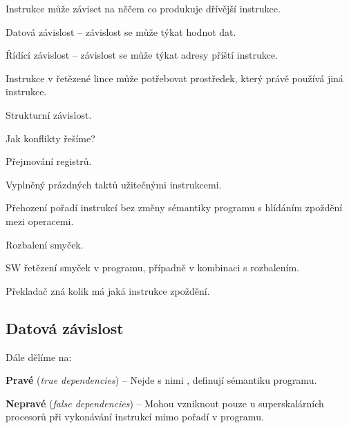 \begin{compactitem}
    \item Instrukce může záviset na něčem co produkuje dřívější instrukce. \begin{compactitem}
        \item Datová závislost -- závislost se může týkat hodnot dat.
        \item Řídící závislost -- závislost se může týkat adresy příští instrukce.
    \end{compactitem}

    \item Instrukce v řetězené lince může potřebovat prostředek, který právě používá jiná instrukce. \begin{compactitem}
        \item Strukturní závislost.
    \end{compactitem}

    \item Jak konflikty řešíme? \begin{compactitem}
        \item Přejmování registrů.
        \item Vyplněný prázdných taktů užitečnými instrukcemi.
        \item Přehození pořadí instrukcí bez změny sémantiky programu s hlídáním zpoždění mezi operacemi.
        \item Rozbalení smyček.
        \item SW řetězení smyček v programu, případně v kombinaci s rozbalením.
        \item Překladač zná kolik má jaká instrukce zpoždění.
    \end{compactitem}
\end{compactitem}

\subsection{Datová závislost}

\begin{compactitem}
    \item Dále dělíme na: \begin{compactitem}
        \item \textbf{Pravé} (\textit{true dependencies}) -- Nejde s nimi , definují sémantiku programu.
        \item \textbf{Nepravé} (\textit{false dependencies}) -- Mohou vzniknout pouze u superskalárních procesorů při vykonávání instrukcí mimo pořadí v programu.
    \end{compactitem}
\end{compactitem}

